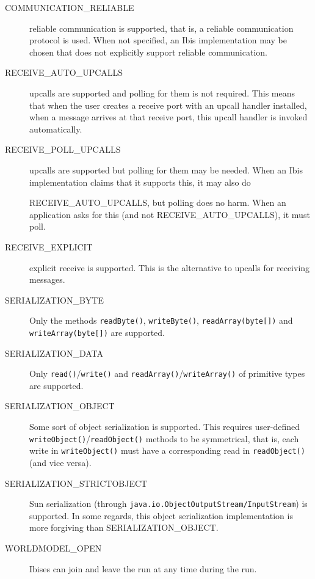 \documentclass[10pt]{article}
\begin{document}
\begin{description}
\item[COMMUNICATION\_RELIABLE]
reliable communication is supported, that is,
a reliable communication protocol is used.
When not specified, an Ibis implementation may be chosen that does not
explicitly
support reliable communication.

\item[RECEIVE\_AUTO\_UPCALLS]
upcalls are supported and polling for them is not required.
This means that when the user creates a receive port with an upcall
handler installed, when a message arrives at that receive port, 
this upcall handler is invoked automatically.

\item[RECEIVE\_POLL\_UPCALLS]
upcalls are supported but polling for them may be needed. When an
Ibis implementation claims that it supports this, it may also do

RECEIVE\_AUTO\_UPCALLS, but polling does no harm. When an application
asks for
this (and not RECEIVE\_AUTO\_UPCALLS), it must poll.

\item[RECEIVE\_EXPLICIT]
explicit receive is supported.
This is the alternative to upcalls for receiving messages.

\item[SERIALIZATION\_BYTE]
Only the methods \texttt{readByte()}, \texttt{writeByte()},
\texttt{readArray(byte[])} and \texttt{writeArray(byte[])} are
supported.

\item[SERIALIZATION\_DATA]
Only \texttt{read()}/\texttt{write()} and
\texttt{readArray()}/\texttt{writeArray()} of primitive types are
supported.

\item[SERIALIZATION\_OBJECT]
Some sort of object serialization is supported.
This requires user-defined
\texttt{writeObject()}/\texttt{readObject()} methods to be symmetrical,
that is,
each write in \texttt{writeObject()} must have a corresponding read
in \texttt{readObject()} (and vice versa).

\item[SERIALIZATION\_STRICTOBJECT]
Sun serialization (through
\texttt{java.io.ObjectOutputStream/InputStream}) is
supported. In some regards, this object serialization implementation is
more
forgiving than SERIALIZATION\_OBJECT.

\item[WORLDMODEL\_OPEN]
Ibises can join and leave the run at any time during the run.

\end{description}
\end{document}
